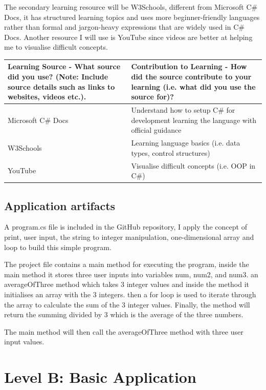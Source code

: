 \documentclass[a4paper, 11pt]{report}
\begin{document}
The secondary learning resource will be W3Schools, different from Microsoft C\# Docs, it has structured learning topics and uses more beginner-friendly languages rather than formal and jargon-heavy expressions that are widely used in C\# Docs. Another resource I will use is YouTube since videos are better at helping me to visualise difficult concepts.

\begin{tabular}{|p{}|p{}|}
	\hline
	Learning Source - What source did you use? (Note: Include source details such as links to websites, videos etc.). & Contribution to Learning - How did the source contribute to your learning (i.e. what did you use the source for)?\\
	\hline
	Microsoft C\# Docs & Understand how to setup C\# for development  learning the language with official guidance\\
	\hline
	 W3Schools & Learning language basics (i.e. data types, control structures)\\
	\hline
	YouTube & Visualise difficult concepts (i.e. OOP in C\#)\\
\end{tabular}

\subsection{Application artifacts}
A program.cs file is included in the GitHub repository, I apply the concept of print, user input, the string to integer manipulation, one-dimensional array and loop to build this simple program.

The project file contains a main method for executing the program, inside the main method it stores three user inputs into variables num, num2, and num3. an averageOfThree method which takes 3 integer values and inside the method it initialises an array with the 3 integers. then a for loop is used to iterate through the array to calculate the sum of the 3 integer values. Finally, the method will return the summing divided by 3 which is the average of the three numbers. 

The main method will then call the averageOfThree method with three user input values.





\newpage
\section{Level B: Basic Application}
\end{document}
